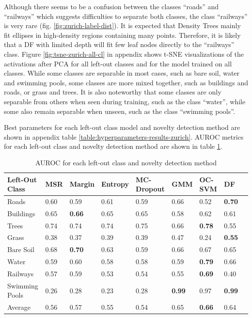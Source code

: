 \documentclass[10pt]{article}
\begin{document}
Although there seems to be a confusion between the classes ``roads'' and ``railways'' which suggests difficulties to separate both classes, the class ``railways'' is very rare (fig. \ref{fig:zurich-label-dist}). It is expected that Density Trees mainly fit ellipses in high-density regions containing many points. Therefore, it is likely that a \acrlong{DF} with limited depth will fit few leaf nodes directly to the ``railways'' class. Figure \ref{fig:tsne-zurich-all-cl} in appendix shows \gls{t-SNE} visualizations of the activations after \gls{PCA} for all left-out classes and for the model trained on all classes. While some classes are separable in most cases, such as bare soil, water and swimming pools, some classes are more mixed together, such as buildings and roads, or grass and trees. It is also noteworthy that some classes are only separable from others when seen during training, such as the class ``water'', while some also remain separable when unseen, such as the class ``swimming pools''.

Best parameters for each left-out class model and novelty detection method are shown in appendix table \ref{table:hyperparameters-results-zurich}. \gls{AUROC} metrics for each left-out class and novelty detection method are shown in table \ref{table:zurich-auroc-nd}.

\begin{table}[H]
    \centering
    \begin{tabular}{@{}lllllllll@{}}
    \toprule
    Left-Out Class & MSR  & Margin     & Entropy & \gls{MC-Dropout} & \gls{GMM}     & \gls{OC-SVM}  & \gls{DF}                \\ \midrule
    Roads          &  0.60 &    0.59 &     0.61 &     0.59 &  0.66 &    0.52 &  \textbf{0.70} \\
    Buildings      &  0.65 &    \textbf{0.66} &     0.65 &     0.65 &  0.58 &    0.62 &  0.61 \\
    Trees          &  0.74 &    0.74 &     0.74 &     0.75 &  0.66 &    \textbf{0.78} &  0.55 \\
    Grass          &  0.38 &    0.37 &     0.39 &     0.39 &  0.47 &    0.24 &  \textbf{0.55} \\
    Bare Soil      &  0.68 &    \textbf{0.70} &     0.63 &     0.59 &  0.66 &    0.67 &  0.65 \\
    Water          &  0.59 &    0.60 &     0.58 &     0.58 &  0.59 &    \textbf{0.79} &  0.66 \\
    Railways       &  0.57 &    0.59 &     0.53 &     0.54 &  0.55 &    \textbf{0.69} &  0.40 \\
    Swimming Pools &  0.26 &    0.28 &     0.23 &     0.28 &  \textbf{0.99} &    0.97 &  \textbf{0.99} \\\midrule
    Average       &    0.56 & 0.57 & 0.55 & 0.54 & 0.65 & \textbf{0.66} & 0.64 \\\bottomrule
    \end{tabular}
    \caption{\gls{AUROC} for each left-out class and novelty detection method}
    \label{table:zurich-auroc-nd}
\end{table}
\end{document}
